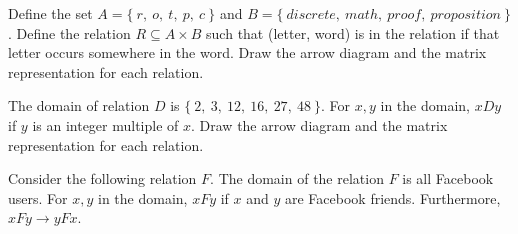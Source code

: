 \documentclass[]{exam}
\begin{document}
  \begin{center}
  \end{center}

  \begin{questions}
    \question Define the set $A = \{\ r,\ o,\ t,\ p,\ c\ \}$ and $B = \{\
      discrete,\ math,\ proof,\ proposition\ \}$. Define the relation $R
      \subseteq A \times B$ such that (letter, word) is in the relation if that
      letter occurs somewhere in the word. Draw the arrow diagram and the matrix
      representation for each relation.

    \question The domain of relation $D$ is $\{\ 2,\ 3,\ 12,\ 16,\ 27,\ 48\ \}$.
      For $x, y$ in the domain, $xDy$ if $y$ is an integer multiple of $x$. Draw
      the arrow diagram and the matrix representation for each relation.
      \vspace{\stretch{1}}

    \question Consider the following relation $F$. The domain of the relation
      $F$ is all Facebook users. For $x,y$ in the domain, $xFy$ if $x$ and
      $y$ are Facebook friends. Furthermore, $xFy \rightarrow yFx$. 



\end{questions}
\end{document}
